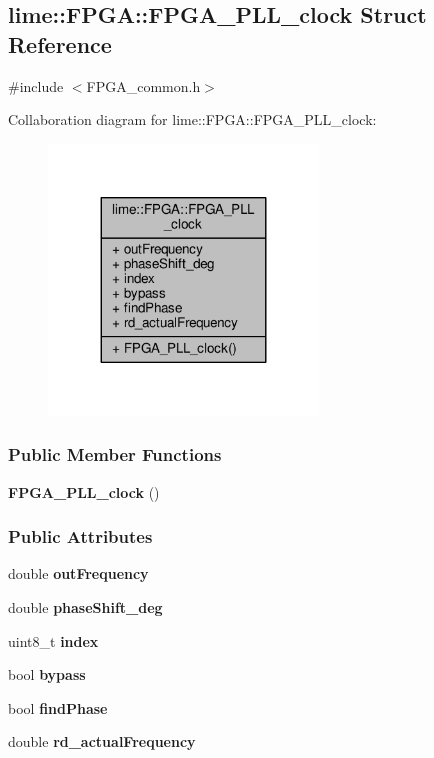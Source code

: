 \subsection{lime\+:\+:F\+P\+GA\+:\+:F\+P\+G\+A\+\_\+\+P\+L\+L\+\_\+clock Struct Reference}
\label{structlime_1_1FPGA_1_1FPGA__PLL__clock}


{\ttfamily \#include $<$F\+P\+G\+A\+\_\+common.\+h$>$}



Collaboration diagram for lime\+:\+:F\+P\+GA\+:\+:F\+P\+G\+A\+\_\+\+P\+L\+L\+\_\+clock\+:
\nopagebreak
\begin{figure}[H]
\begin{center}
\leavevmode
\includegraphics[width=203pt]{d2/d33/structlime_1_1FPGA_1_1FPGA__PLL__clock__coll__graph}
\end{center}
\end{figure}
\subsubsection*{Public Member Functions}
\begin{DoxyCompactItemize}
\item 
{\bf F\+P\+G\+A\+\_\+\+P\+L\+L\+\_\+clock} ()
\end{DoxyCompactItemize}
\subsubsection*{Public Attributes}
\begin{DoxyCompactItemize}
\item 
double {\bf out\+Frequency}
\item 
double {\bf phase\+Shift\+\_\+deg}
\item 
uint8\+\_\+t {\bf index}
\item 
bool {\bf bypass}
\item 
bool {\bf find\+Phase}
\item 
double {\bf rd\+\_\+actual\+Frequency}
\end{DoxyCompactItemize}


